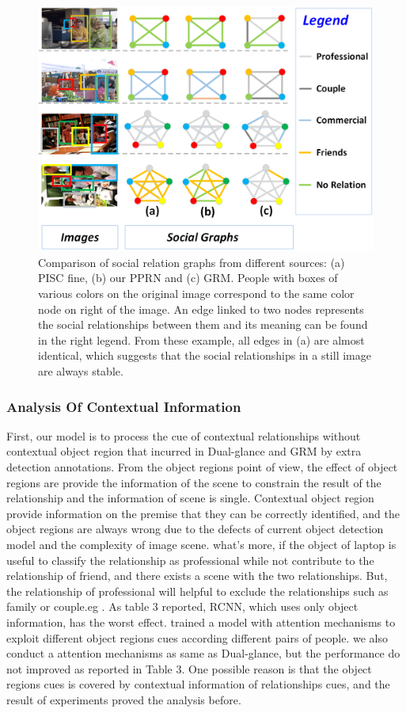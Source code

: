 \documentclass{article}
\newcommand{\PPRN}{{\sf PPRN}}
\begin{document}
\begin{figure}[ht]
  \centering
  \includegraphics[width=0.85\linewidth]{pic/case_study_pisc_fine_union_1.png}
  \caption{Comparison of social relation graphs from different sources: (a) PISC fine, (b) our {\PPRN}  and (c) GRM. People with boxes of various colors on the original image correspond to the same color node on right of the image. An edge linked to two nodes represents the social relationships between them and its meaning can be found in the right legend. From these example, all edges in (a) are almost identical, which suggests that the social relationships in a still image are always stable.}
  \label{fig:case_study}
\end{figure}

\subsubsection{Analysis Of Contextual Information}

First, our model is to process the cue of contextual relationships without contextual object region that incurred in Dual-glance and GRM by extra detection annotations.
From the object regions point of view, the effect of object regions are provide the information of the scene to constrain the result of the relationship and the information of scene is single. 
Contextual object region provide information on the premise that they can be correctly identified, and the object regions are always wrong due to the defects of current object detection model and the complexity of image scene.
what's more, if the object of laptop is useful to classify the relationship as professional while not contribute to the relationship of friend, and there exists a scene with the two relationships. But, the relationship of professional will helpful to exclude the relationships such as family or couple.eg .
As table 3 reported, RCNN, which uses only object information, has the worst effect. \cite{DBLP:conf/iccv/LiWZK17} trained a model with attention mechanisms to exploit different object regions cues according different pairs of people. we also conduct a attention mechanisms as same as Dual-glance, but the performance do not improved as reported in Table 3.
One possible reason is that the object regions cues is covered by contextual information of relationships cues, and the result of experiments proved the analysis before.
\end{document}
